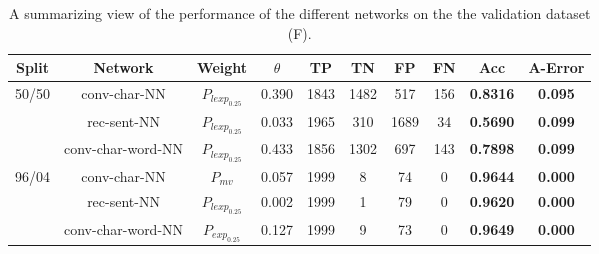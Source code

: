\begin{table}[h]
\begin{tabular}{|c|c|c|c|c|c|c|c||c|c|}
\hline
Split & Network & Weight & $\theta$ & TP & TN & FP & FN & \textbf{Acc} & \textbf{A-Error} \\ \hline
\multirow{3}{*}{50/50} & \gls{conv-char-NN} & $P_{lexp_{0.25}}$ & 0.390 & 1843 & 1482 & 517 & 156 & \textbf{0.8316} & \textbf{0.095} \\ \cline{2-10} 
 & \gls{rec-sent-NN} & $P_{lexp_{0.25}}$ & 0.033 & 1965 & 310 & 1689 & 34 & \textbf{0.5690} & \textbf{0.099} \\ \cline{2-10} 
 & \gls{conv-char-word-NN} & $P_{lexp_{0.25}}$ & 0.433 & 1856 & 1302 & 697 & 143 & \textbf{0.7898} & \textbf{0.099} \\ \hline
\multirow{3}{*}{96/04} & \gls{conv-char-NN} & $P_{mv}$ & 0.057 & 1999 & 8 & 74 & 0 & \textbf{0.9644} & \textbf{0.000} \\ \cline{2-10} 
 & \gls{rec-sent-NN} & $P_{lexp_{0.25}}$ & 0.002 & 1999 & 1 & 79 & 0 & \textbf{0.9620} & \textbf{0.000} \\ \cline{2-10} 
 & \gls{conv-char-word-NN} & $P_{exp_{0.25}}$ & 0.127 & 1999 & 9 & 73 & 0 & \textbf{0.9649} & \textbf{0.000} \\ \hline
\end{tabular}
\caption{A summarizing view of the performance of the different networks on the
the validation dataset (F).}
\label{tab:experi-results}
\end{table}
